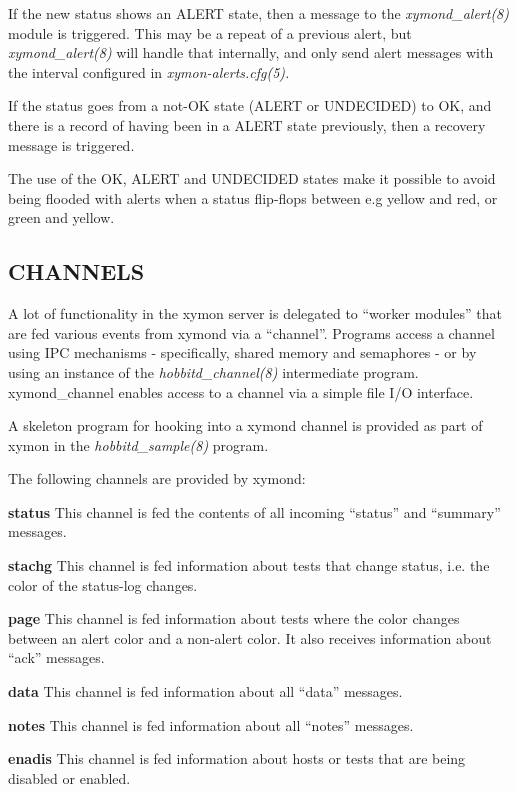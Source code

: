   If the new status shows an ALERT state, then a message to the \emph{xymond\_alert(8) }
 module is triggered. This may be a repeat of a previous alert, but \emph{xymond\_alert(8)}
 will handle that internally, and only send alert messages with the interval configured in \emph{xymon-alerts.cfg(5).}



  If the status goes from a not-OK state (ALERT or UNDECIDED) to OK, and there is a record of having been in a ALERT state previously, then a recovery message is triggered. 


  The use of the OK, ALERT and UNDECIDED states make it possible to avoid being flooded with alerts when a status flip-flops between e.g yellow and red, or green and yellow. 


 
\subsection{CHANNELS}
 A lot of functionality in the xymon server is delegated to ``worker modules'' that are fed various events from xymond via a ``channel''. Programs access a channel using IPC mechanisms - specifically, shared memory and semaphores - or by using an instance of the \emph{hobbitd\_channel(8)}
 intermediate program. xymond\_channel enables access to a channel via a simple file I/O interface. 

  A skeleton program for hooking into a xymond channel is provided as part of xymon in the \emph{hobbitd\_sample(8)}
 program. 


  The following channels are provided by xymond: 


 \textbf{status}
 This channel is fed the contents of all incoming ``status'' and ``summary'' messages. 


 \textbf{stachg}
 This channel is fed information about tests that change status, i.e. the color of the status-log changes. 


 \textbf{page}
 This channel is fed information about tests where the color changes between an alert color and a non-alert color. It also receives information about ``ack'' messages. 


 \textbf{data}
 This channel is fed information about all ``data'' messages. 


 \textbf{notes}
 This channel is fed information about all ``notes'' messages. 


 \textbf{enadis}
 This channel is fed information about hosts or tests that are being disabled or enabled. 


